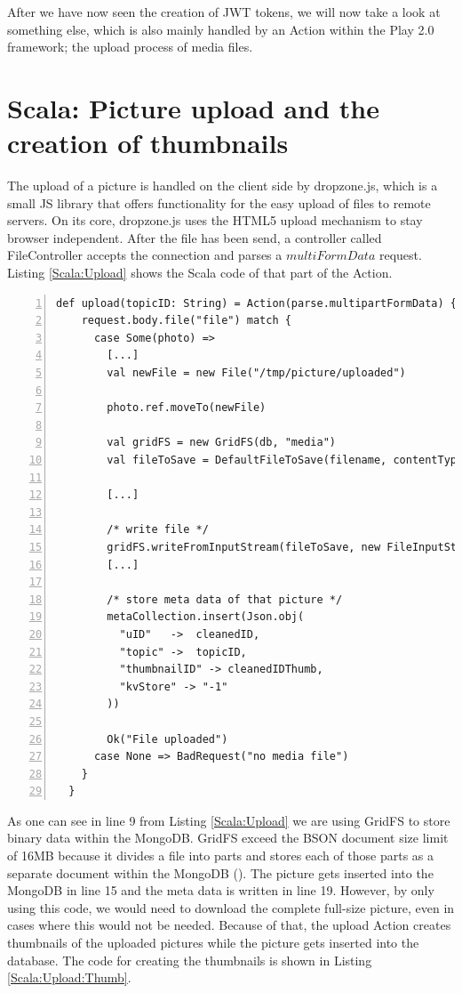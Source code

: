 After we have now seen the creation of JWT tokens, we will now take a look at something else, which is also mainly handled by an Action within the Play 2.0 framework; the upload process of media files. 

\section{Scala: Picture upload and the creation of thumbnails}
The upload of a picture is handled on the client side by dropzone.js, which is a small \ac{JS} library that offers functionality for the easy upload of files to remote servers. On its core, dropzone.js uses the \ac{HTML5} upload mechanism to stay  browser independent. After the file has been send, a controller called FileController accepts the connection and parses a $multiFormData$ request. Listing \ref{Scala:Upload} shows the Scala code of that part of the Action.

\begin{lstlisting}[numbers=left,caption={Snippet of the upload Action of the FileController for uploading pictures},label=Scala:Upload,frame=tlbr,breaklines]
def upload(topicID: String) = Action(parse.multipartFormData) { request =>
    request.body.file("file") match {
      case Some(photo) =>
        [...]
        val newFile = new File("/tmp/picture/uploaded")

        photo.ref.moveTo(newFile)

        val gridFS = new GridFS(db, "media")
        val fileToSave = DefaultFileToSave(filename, contentType)

        [...]

        /* write file */
        gridFS.writeFromInputStream(fileToSave, new FileInputStream(newFile))
        [...]

        /* store meta data of that picture */
        metaCollection.insert(Json.obj(
          "uID"   ->  cleanedID,
          "topic" ->  topicID,
          "thumbnailID" -> cleanedIDThumb,
          "kvStore" -> "-1"
        ))

        Ok("File uploaded")
      case None => BadRequest("no media file")
    }
  }
\end{lstlisting}

As one can see in line 9 from Listing \ref{Scala:Upload} we are using GridFS to store binary data within the MongoDB. GridFS exceed the \ac{BSON} document size limit of 16MB because it divides a file into parts and stores each of those parts as a separate document within the MongoDB (\cite{gridfs}). The picture gets inserted into the MongoDB in line 15 and the meta data is written in line 19. However, by only using this code, we would need to download the complete full-size picture, even in cases where this would not be needed.  Because of that, the upload Action creates thumbnails of the uploaded pictures while the picture gets inserted into the database. The code for creating the thumbnails is shown in Listing \ref{Scala:Upload:Thumb}.

